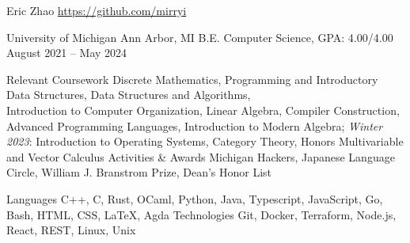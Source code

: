 \documentclass[letterpaper,11pt]{article}
\begin{document}
\rheading
  {Eric Zhao}
  {}
  {\href{https://github.com/mirryi}{https://github.com/mirryi}}
  {}

  \begin{rsectionlist}
    \rsectionitem%
      {University of Michigan}
      {Ann Arbor, MI}
      {B.E. Computer Science, GPA: 4.00/4.00}
      {August 2021 -- May 2024}
      \begin{rpointlist}
        \rpoint
          {Relevant Coursework}
          {Discrete Mathematics, Programming and Introductory Data Structures, Data Structures and
            Algorithms, \\ Introduction to Computer Organization, Linear Algebra, Compiler
            Construction, Advanced Programming Languages, Introduction to Modern Algebra;
            \emph{Winter 2023}: Introduction to Operating Systems, Category Theory, Honors
            Multivariable and Vector Calculus }
        \rpoint
          {Activities \& Awards}
          {Michigan Hackers, Japanese Language Circle, William J. Branstrom Prize, Dean's Honor List}
      \end{rpointlist}
  \end{rsectionlist}

  \begin{rlinelist}
    \rline
      {Languages}
      {C++, C, Rust, OCaml, Python, Java, Typescript, JavaScript, Go, Bash, HTML, CSS, \LaTeX, Agda}
    \rline
      {Technologies}
      {Git, Docker, Terraform, Node.js, React, REST, Linux, Unix}
  \end{rlinelist}
\end{document}

